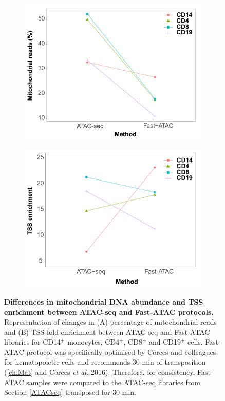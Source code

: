 \begin{figure}[htbp]
\centering
\begin{subfigure}{0.5\textwidth}
\centering
\includegraphics[width=\textwidth]{./Results1/pdfs/ATAC_vs_FAST_ATAC_percnt_MT_reads_dotplot}
\caption{\textbf{}}
\end{subfigure}%
\begin{subfigure}{0.5\textwidth}
\centering
\includegraphics[width=\textwidth]{./Results1/pdfs/ATAC_vs_FAST_ATAC_tss_dotplot}
\caption{\textbf{}}
\end{subfigure}
\caption[Differences in mitochondrial DNA abundance and TSS enrichment between ATAC-seq and Fast-ATAC protocols.]{\textbf{Differences in mitochondrial DNA abundance and TSS enrichment between ATAC-seq and Fast-ATAC protocols.} Representation of changes in (A) percentage of mitochondrial reads and (B) TSS fold-enrichment between ATAC-seq and Fast-ATAC libraries for CD14$^+$ monocytes, CD4$^+$, CD8$^+$ and CD19$^+$ cells. Fast-ATAC protocol was specifically optimised by Corces and colleagues for hematopoietic cells and recommends 30 min of transposition (\ref{ch:Mat} and Corces \textit{et al.} 2016). Therefore, for consistency, Fast-ATAC samples were compared to the ATAC-seq libraries from Section \ref{ATACseq} transposed for 30 min.}

\end{figure}
